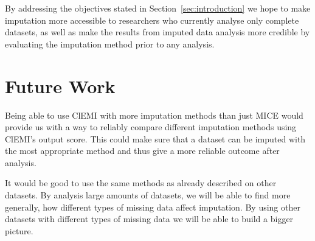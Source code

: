 \documentclass[conference,compsoc]{IEEEtran}
\begin{document}
	By addressing the objectives stated in Section~\ref{sec:introduction} we hope to make imputation more accessible to researchers who currently analyse only complete datasets, as well as make the results from imputed data analysis more credible by evaluating the imputation method prior to any analysis. %

	\section{Future Work} %
	\label{sec:future_work}
	Being able to use ClEMI with more imputation methods than just MICE would provide us with a way to reliably compare different imputation methods using ClEMI's output score. This could make sure that a dataset can be imputed with the most appropriate method and thus give a more reliable outcome after analysis. 

	It would be good to use the same methods as already described on other datasets. By analysis large amounts of datasets, we will be able to find more generally, how different types of missing data affect imputation.  By using other datasets with different types of missing data we will be able to build a bigger picture. 

	
	
\end{document}
